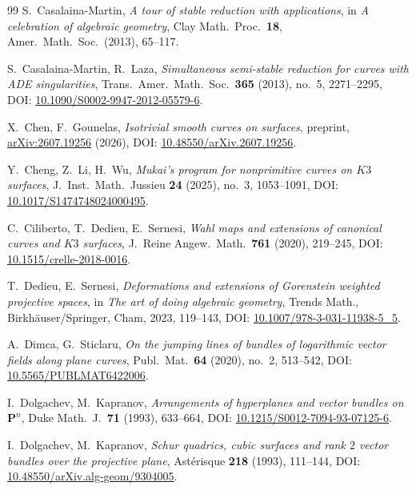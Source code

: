 \documentclass[a4paper,12pt,twoside,reqno]{amsart}
\numberwithin{equation}{section}
\theoremstyle{plain}
\theoremstyle{definition}
\newcommand{\PP}{\mathbf{P}}
\theoremstyle{plain}
\theoremstyle{definition}
\begin{document}
\begin{thebibliography}{99}
S.~Casalaina-Martin, \emph{A tour of stable reduction with applications}, in \emph{A celebration of algebraic geometry}, Clay Math.\ Proc.\ \textbf{18}, Amer.\ Math.\ Soc.\ (2013), 65--117.

S.~Casalaina-Martin, R.~Laza, \emph{Simultaneous semi-stable reduction for curves with ADE singularities}, Trans.\ Amer.\ Math.\ Soc.\ \textbf{365} (2013), no.\ 5, 2271--2295, DOI: \href{https://doi.org/10.1090/S0002-9947-2012-05579-6}{10.1090/S0002-9947-2012-05579-6}.

X.~Chen, F.~Gounelas, \emph{Isotrivial smooth curves on surfaces}, preprint, \href{https://arxiv.org/abs/2607.19256}{arXiv:2607.19256} (2026), DOI: \href{https://doi.org/10.48550/arXiv.2607.19256}{10.48550/arXiv.2607.19256}.

Y.~Cheng, Z.~Li, H.~Wu, \emph{Mukai's program for nonprimitive curves on $K3$ surfaces}, J.\ Inst.\ Math.\ Jussieu \textbf{24} (2025), no.~3, 1053--1091, DOI: \href{https://doi.org/10.1017/S1474748024000495}{10.1017/S1474748024000495}.

C.~Ciliberto, T.~Dedieu, E.~Sernesi, \emph{Wahl maps and extensions of canonical curves and $K3$ surfaces}, J.\ Reine Angew.\ Math.\ \textbf{761} (2020), 219--245, DOI: \href{https://doi.org/10.1515/crelle-2018-0016}{10.1515/crelle-2018-0016}.

T.~Dedieu, E.~Sernesi, \emph{Deformations and extensions of Gorenstein weighted projective spaces}, in \emph{The art of doing algebraic geometry}, Trends Math., Birkh\"auser/Springer, Cham, 2023, 119--143, DOI: \href{https://doi.org/10.1007/978-3-031-11938-5_5}{10.1007/978-3-031-11938-5\_5}.

A.~Dimca, G.~Sticlaru, \emph{On the jumping lines of bundles of logarithmic vector fields along plane curves}, Publ.\ Mat.\ \textbf{64} (2020), no.\ 2, 513--542, DOI: \href{https://doi.org/10.5565/PUBLMAT6422006}{10.5565/PUBLMAT6422006}.

I.~Dolgachev, M.~Kapranov, \emph{Arrangements of hyperplanes and vector bundles on $\PP^n$}, Duke Math.\ J.\ \textbf{71} (1993), 633--664, DOI: \href{https://doi.org/10.1215/S0012-7094-93-07125-6}{10.1215/S0012-7094-93-07125-6}.

I.~Dolgachev, M.~Kapranov, \emph{Schur quadrics, cubic surfaces and rank $2$ vector bundles over the projective plane}, Ast\'erisque \textbf{218} (1993), 111--144, DOI: \href{https://doi.org/10.48550/arXiv.alg-geom/9304005}{10.48550/arXiv.alg-geom/9304005}.


\end{thebibliography}
\end{document}
